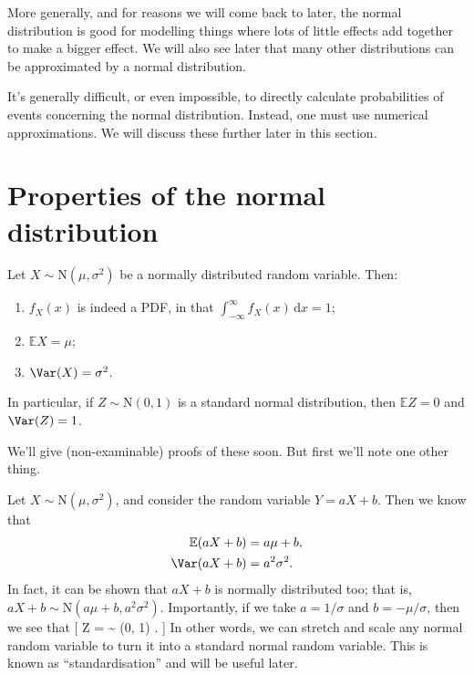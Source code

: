 \documentclass[
  letterpaper,
]{report}
\providecommand{\tightlist}{%
  \setlength{\itemsep}{0pt}\setlength{\parskip}{0pt}}\usepackage{longtable,booktabs,array}
\theoremstyle{definition}
\theoremstyle{definition}
\theoremstyle{remark}
\begin{document}
More generally, and for reasons we will come back to later, the normal
distribution is good for modelling things where lots of little effects
add together to make a bigger effect. We will also see later that many
other distributions can be approximated by a normal distribution.

It's generally difficult, or even impossible, to directly calculate
probabilities of events concerning the normal distribution. Instead, one
must use numerical approximations. We will discuss these further later
in this section.

\hypertarget{normal-properties}{%
\section{Properties of the normal
distribution}\label{normal-properties}}

\leavevmode{}%
Let \(X \sim \mathrm{N}(\mu, \sigma^2)\) be a normally distributed
random variable. Then:

\begin{enumerate}
\def\labelenumi{\arabic{enumi}.}
\tightlist
\item
  \(f_X(x)\) is indeed a PDF, in that
  \(\displaystyle\int_{-\infty}^\infty f_X(x)\,\mathrm dx = 1\);
\item
  \(\mathbb EX = \mu\);
\item
  \(\Var(X) = \sigma^2\).
\end{enumerate}

In particular, if \(Z \sim \mathrm{N}(0, 1)\) is a standard normal
distribution, then \(\mathbb EZ = 0\) and \(\Var(Z) = 1\).

We'll give (non-examinable) proofs of these soon. But first we'll note
one other thing.

Let \(X \sim \mathrm{N}(\mu, \sigma^2)\), and consider the random
variable \(Y = aX + b\). Then we know that \begin{align*}
\mathbb E(aX + b) &= a\mu + b , \\
\Var(aX + b) &= a^2 \sigma^2 .
\end{align*} In fact, it can be shown that \(aX + b\) is normally
distributed too; that is,
\(aX + b \sim \mathrm{N}(a\mu + b, a^2 \sigma^2)\). Importantly, if we
take \(a = 1/\sigma\) and \(b = -\mu/\sigma\), then we see that {[} Z =
 \sim {} (0, 1) . {]} In other words, we can
stretch and scale any normal random variable to turn it into a standard
normal random variable. This is known as ``standardisation'' and will be
useful later.
\end{document}
